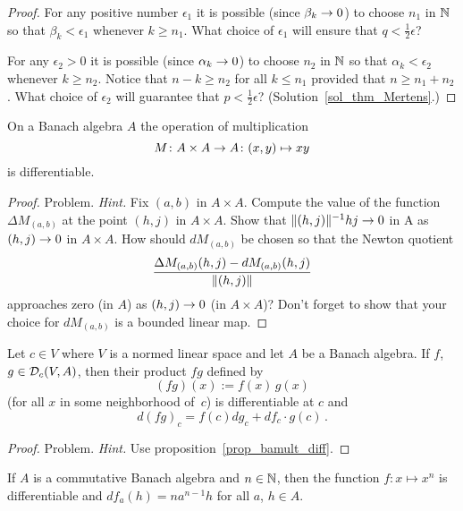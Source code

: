 \begin{proof}
For any positive number $\epsilon_1$ it is possible (since $\beta_k \rightarrow 0$) to choose $n_1$
in $\mathbb{N}$ so that $\beta_k < \epsilon_1$ whenever $k \ge n_1$.  What choice of $\epsilon_1$ will
ensure that $q < \frac12\epsilon$?

For any $\epsilon_2 > 0$ it is possible (since $\alpha_k \rightarrow 0$) to choose $n_2$ in $\mathbb{N}$ so
that $\alpha_k < \epsilon_2$ whenever $k \ge n_2$.  Notice that $n-k \ge n_2$ for all $k \le
n_1$ provided that $n \ge n_1 + n_2$.  What choice of $\epsilon_2$ will guarantee that $p <
\frac12\epsilon$?  (Solution~\ref{sol_thm_Mertens}.) \ns
\end{proof}

\begin{prop}\label{prop_bamult_diff}  On a Banach algebra $A$ the operation of multiplication
  \[ M\colon  A \times A \rightarrow A\colon  (x,y) \mapsto xy \]
is differentiable.
\end{prop}

\begin{proof} Problem.   \emph{Hint.}   Fix $(a,b)$ in $A \times A$.  Compute the value of the
function $\Delta M_{(a,b)}$ at the point $(h,j)$ in $A \times A$.  Show that
$\lVert(h,j)\rVert^{-1}hj \rightarrow 0$ in A as $(h,j) \rightarrow 0$ in $A \times A$.  How should $dM_{(a,b)}$
be chosen so that the Newton quotient
  \[ \frac{\Delta M_{(a,b)}(h,j) - dM_{(a,b)}(h,j)}{\lVert(h,j)\rVert} \]
approaches zero (in $A$) as $(h,j) \rightarrow 0$ (in $A \times A$)?  Don't forget to show that your
choice for $dM_{(a,b)}$ is a bounded linear map.     \ns
\end{proof}

\begin{prop}  Let $c \in V$ where $V$ is a normed linear space and let $A$ be a Banach algebra.
If $f$, $g \in \mathcal{D}_c(V,A)$, then their product $fg$ defined by
  \[ (fg)(x) := f(x)\, g(x) \]
(for all $x$ in some neighborhood of~$c$) is differentiable at $c$ and
  \[ d(fg)_c = f(c)dg_c + df_c \cdot g(c)\,. \]
\end{prop}

\begin{proof} Problem.  \emph{Hint.}  Use proposition~\ref{prop_bamult_diff}.  \ns
\end{proof}

\begin{prop}\label{prop_bapower_diff}  If $A$ is a commutative Banach algebra and $n \in \mathbb{N}$,
then the function $f \colon x \mapsto x^n$ is differentiable and $df_a(h) = na^{n-1}h$ for all
$a$, $h \in A$.
\end{prop}

